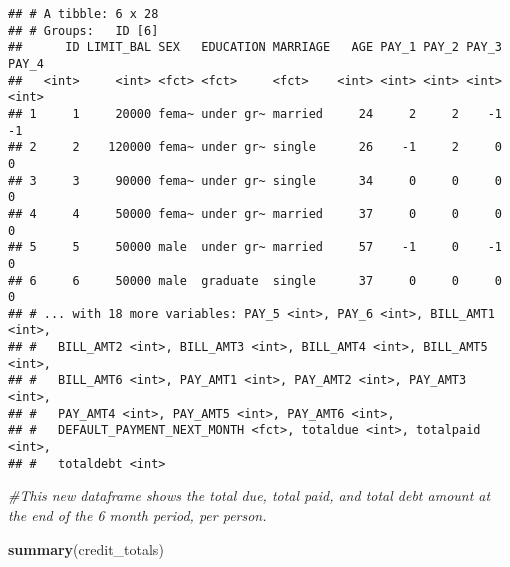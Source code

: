 \documentclass[]{article}
\newenvironment{Shaded}{\begin{snugshade}}{\end{snugshade}}
\newcommand{\KeywordTok}[1]{\textcolor[rgb]{0.13,0.29,0.53}{\textbf{#1}}}
\newcommand{\CommentTok}[1]{\textcolor[rgb]{0.56,0.35,0.01}{\textit{#1}}}
\newcommand{\NormalTok}[1]{#1}
\begin{document}
\begin{verbatim}
## # A tibble: 6 x 28
## # Groups:   ID [6]
##      ID LIMIT_BAL SEX   EDUCATION MARRIAGE   AGE PAY_1 PAY_2 PAY_3 PAY_4
##   <int>     <int> <fct> <fct>     <fct>    <int> <int> <int> <int> <int>
## 1     1     20000 fema~ under gr~ married     24     2     2    -1    -1
## 2     2    120000 fema~ under gr~ single      26    -1     2     0     0
## 3     3     90000 fema~ under gr~ single      34     0     0     0     0
## 4     4     50000 fema~ under gr~ married     37     0     0     0     0
## 5     5     50000 male  under gr~ married     57    -1     0    -1     0
## 6     6     50000 male  graduate  single      37     0     0     0     0
## # ... with 18 more variables: PAY_5 <int>, PAY_6 <int>, BILL_AMT1 <int>,
## #   BILL_AMT2 <int>, BILL_AMT3 <int>, BILL_AMT4 <int>, BILL_AMT5 <int>,
## #   BILL_AMT6 <int>, PAY_AMT1 <int>, PAY_AMT2 <int>, PAY_AMT3 <int>,
## #   PAY_AMT4 <int>, PAY_AMT5 <int>, PAY_AMT6 <int>,
## #   DEFAULT_PAYMENT_NEXT_MONTH <fct>, totaldue <int>, totalpaid <int>,
## #   totaldebt <int>
\end{verbatim}

\begin{Shaded}
\begin{Highlighting}[]
\CommentTok{#This new dataframe shows the total due, total paid, and total debt amount at the end of the 6 month period, per person. }
\end{Highlighting}
\end{Shaded}

\begin{Shaded}
\begin{Highlighting}[]
\KeywordTok{summary}\NormalTok{(credit_totals)}
\end{Highlighting}
\end{Shaded}
\end{document}
